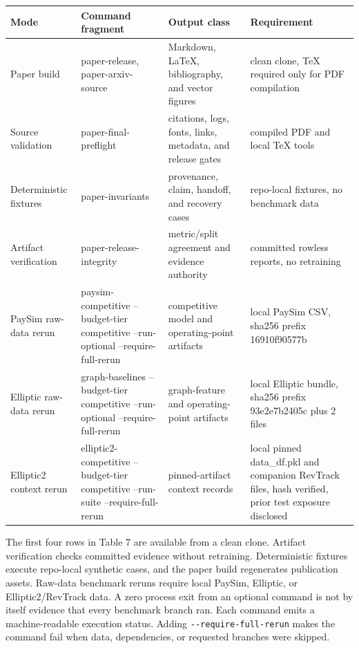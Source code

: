 \documentclass[11pt]{article}
\begin{document}
\begin{center}
\begin{minipage}{\linewidth}
\small
\setlength{\tabcolsep}{3pt}
\renewcommand{\arraystretch}{1.16}
\begin{tabularx}{\linewidth}{@{}>{\raggedright\arraybackslash}X >{\raggedright\arraybackslash}X >{\raggedright\arraybackslash}X >{\raggedright\arraybackslash}X@{}}
\toprule
Mode & Command fragment & Output class & Requirement \\
\midrule
Paper build & paper-release, paper-arxiv-source & Markdown, LaTeX, bibliography, and vector figures & clean clone, TeX required only for PDF compilation \\
Source validation & paper-final-preflight & citations, logs, fonts, links, metadata, and release gates & compiled PDF and local TeX tools \\
Deterministic fixtures & paper-invariants & provenance, claim, handoff, and recovery cases & repo-local fixtures, no benchmark data \\
Artifact verification & paper-release-integrity & metric/split agreement and evidence authority & committed rowless reports, no retraining \\
PaySim raw-data rerun & paysim-competitive --budget-tier competitive --run-optional --require-full-rerun & competitive model and operating-point artifacts & local PaySim CSV, sha256 prefix 16910f90577b \\
Elliptic raw-data rerun & graph-baselines --budget-tier competitive --run-optional --require-full-rerun & graph-feature and operating-point artifacts & local Elliptic bundle, sha256 prefix 93e2e7b2405c plus 2 files \\
\mbox{Elliptic2} context rerun & elliptic2-competitive --budget-tier competitive --run-suite --require-full-rerun & pinned-artifact context records & local pinned data\_df.pkl and companion RevTrack files, hash verified, prior test exposure disclosed \\
\bottomrule
\end{tabularx}
\end{minipage}
\end{center}


The first four rows in Table 7 are available from a clean clone. Artifact verification checks committed evidence without retraining. Deterministic fixtures execute repo-local synthetic cases, and the paper build regenerates publication assets. Raw-data benchmark reruns require local PaySim, Elliptic, or \mbox{Elliptic2}/RevTrack data. A zero process exit from an optional command is not by itself evidence that every benchmark branch ran. Each command emits a machine-readable execution status. Adding \nolinkurl{--require-full-rerun} makes the command fail when data, dependencies, or requested branches were skipped.
\end{document}
